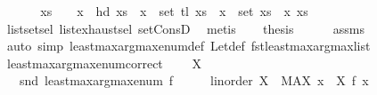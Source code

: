 \begin{isabellebody}
%
\isadelimproof
%
\endisadelimproof
%
\isatagproof
{}\isamarkupfalse%
\ {\isacharminus}{\kern0pt}\isanewline
\ \ \isamarkupfalse%
\ {\isacharasterisk}{\kern0pt}{\isacharcolon}{\kern0pt}\ {\isachardoublequoteopen}xs\ {\isasymnoteq}\ {\isacharbrackleft}{\kern0pt}{\isacharbrackright}{\kern0pt}\ {\isasymLongrightarrow}\ {\isacharparenleft}{\kern0pt}x\ {\isacharequal}{\kern0pt}\ hd\ xs\ {\isasymor}\ x\ {\isasymin}\ set\ {\isacharparenleft}{\kern0pt}tl\ xs{\isacharparenright}{\kern0pt}{\isacharparenright}{\kern0pt}\ {\isasymlongleftrightarrow}\ x\ {\isasymin}\ set\ xs{\isachardoublequoteclose}\ \ x\ xs\isanewline
\ \ \ \ \isamarkupfalse%
\ list{\isachardot}{\kern0pt}set{\isacharunderscore}{\kern0pt}sel\ list{\isachardot}{\kern0pt}exhaust{\isacharunderscore}{\kern0pt}sel\ set{\isacharunderscore}{\kern0pt}ConsD\ \isamarkupfalse%
\ metis\isanewline
\ \ \isamarkupfalse%
\ {\isacharquery}{\kern0pt}thesis\isanewline
\ \ \ \ \isamarkupfalse%
\ assms\isanewline
\ \ \ \ \isamarkupfalse%
\ {\isacharparenleft}{\kern0pt}auto\ simp{\isacharcolon}{\kern0pt}\ least{\isacharunderscore}{\kern0pt}max{\isacharunderscore}{\kern0pt}arg{\isacharunderscore}{\kern0pt}max{\isacharunderscore}{\kern0pt}enum{\isacharunderscore}{\kern0pt}def\ Let{\isacharunderscore}{\kern0pt}def\ fst{\isacharunderscore}{\kern0pt}least{\isacharunderscore}{\kern0pt}max{\isacharunderscore}{\kern0pt}arg{\isacharunderscore}{\kern0pt}max{\isacharunderscore}{\kern0pt}list\ {\isacharasterisk}{\kern0pt}{\isacharparenright}{\kern0pt}\isanewline
{}\isamarkupfalse%
%
\endisatagproof
{\isafoldproof}%
%
\isadelimproof
\isanewline
%
\endisadelimproof
\isanewline
{}\isamarkupfalse%
\ least{\isacharunderscore}{\kern0pt}max{\isacharunderscore}{\kern0pt}arg{\isacharunderscore}{\kern0pt}max{\isacharunderscore}{\kern0pt}enum{\isacharunderscore}{\kern0pt}correct{}{\isacharcolon}{\kern0pt}\ \isanewline
\ \ \ {\isachardoublequoteopen}X\ {\isasymnoteq}\ {\isacharbraceleft}{\kern0pt}{\isacharbraceright}{\kern0pt}{\isachardoublequoteclose}\isanewline
\ \ \ {\isachardoublequoteopen}snd\ {\isacharparenleft}{\kern0pt}least{\isacharunderscore}{\kern0pt}max{\isacharunderscore}{\kern0pt}arg{\isacharunderscore}{\kern0pt}max{\isacharunderscore}{\kern0pt}enum\ {\isacharparenleft}{\kern0pt}f\ {\isacharcolon}{\kern0pt}{\isacharcolon}{\kern0pt}\ {\isacharunderscore}{\kern0pt}\ {\isasymRightarrow}\ {\isacharparenleft}{\kern0pt}{\isacharunderscore}{\kern0pt}\ {\isacharcolon}{\kern0pt}{\isacharcolon}{\kern0pt}\ linorder{\isacharparenright}{\kern0pt}{\isacharparenright}{\kern0pt}\ X{\isacharparenright}{\kern0pt}\ {\isacharequal}{\kern0pt}\ {\isacharparenleft}{\kern0pt}MAX\ x\ {\isasymin}\ X{\isachardot}{\kern0pt}\ f\ x{\isacharparenright}{\kern0pt}{\isachardoublequoteclose}\isanewline

\end{isabellebody}
